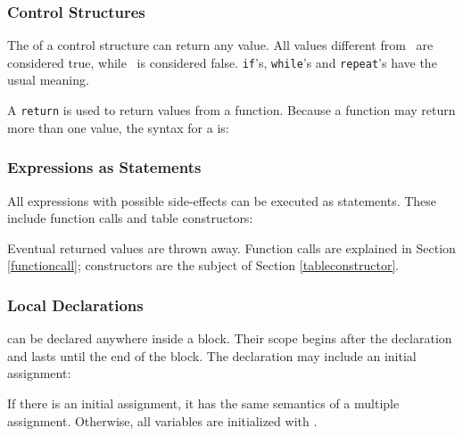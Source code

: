 \subsubsection{Control Structures}
The  of a control structure can return any value.
All values different from \nil\ are considered true,
while \nil\ is considered false.
{\tt if}'s, {\tt while}'s and {\tt repeat}'s have the usual meaning.

\begin{Produc}
\end{Produc}

A {\tt return} is used to return values from a function. \label{return}
Because a function may return more than one value,
the syntax for a  is:
\begin{Produc}
\end{Produc}

\subsubsection{Expressions as Statements} \label{statexp}
All expressions with possible side-effects can be
executed as statements.
These include function calls and table constructors:
\begin{Produc}
\end{Produc}%
Eventual returned values are thrown away.
Function calls are explained in Section \ref{functioncall};
constructors are the subject of Section \ref{tableconstructor}.

\subsubsection{Local Declarations} \label{localvar}
 can be declared anywhere inside a block.
Their scope begins after the declaration and lasts until the
end of the block.
The declaration may include an initial assignment:
\begin{Produc}
\end{Produc}%
If there is an initial assignment, it has the same semantics
of a multiple assignment.
Otherwise, all variables are initialized with \nil.


